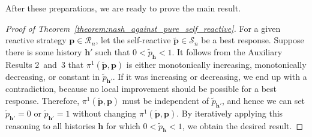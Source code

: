\documentclass[9pt,twoside,lineno]{pnas-new}
\theoremstyle{plainCl1}
\theoremstyle{plainCl2}
\begin{document}
\noindent
After these preparations, we are ready to prove the main result. 

\begin{proof}[Proof of Theorem~\ref{theorem:nash_against_pure_self_reactive}]
For a given reactive strategy $\mathbf{p}\!\in\!\mathcal{R}_n$, let the self-reactive $\mathbf{\tilde p}\!\in\!\mathcal{S}_n$ be a best response. Suppose there is some history $\mathbf{h'}$ such that $0\!<\!\tilde p_\mathbf{h}\!<\!1$. It follows from the Auxiliary Results 2~and~3 that $\pi^1(\mathbf{\tilde p},\mathbf{p})$ is either monotonically increasing, monotonically decreasing, or constant in $\tilde p_\mathbf{h'}$. 
If it was increasing or decreasing, we end up with a contradiction, because no local improvement should be possible for a best response. 
Therefore, $\pi^1(\mathbf{\tilde p},\mathbf{p})$  must be independent of $\tilde p_\mathbf{h'}$, and hence we can set 
$\tilde p_\mathbf{h'}\!=\!0$ or $\tilde p_\mathbf{h'}\!=\!1$ without changing $\pi^1(\mathbf{\tilde p},\mathbf{p})$. By iteratively applying this reasoning to all histories $\mathbf{h}$ for which $0\!<\!\tilde p_\mathbf{h}\!<\!1$, we obtain the desired result. 
\end{proof}

\newpage



\end{document}
